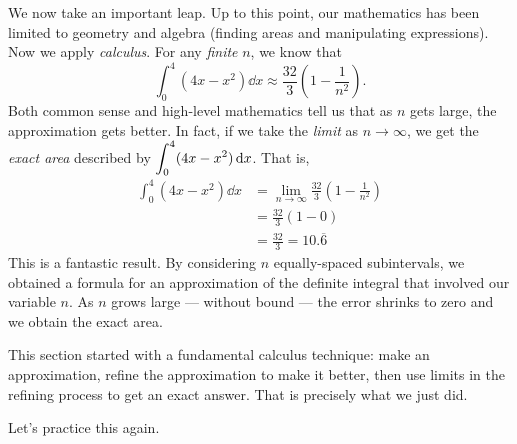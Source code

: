 We now take an important leap. Up to this point, our mathematics has been limited to geometry and algebra (finding areas and manipulating expressions). Now we apply \emph{calculus}. For any \emph{finite} $n$, we know that
\[\int_0^4 (4x-x^2)\dd x \approx \frac{32}{3}\left(1-\frac{1}{n^2}\right).\]
Both common sense and high-level mathematics tell us that as $n$ gets large, the approximation gets better. In fact, if we take the \emph{limit} as $n\rightarrow \infty$, we get the \emph{exact area} described by $\displaystyle\int_0^4 (4x-x^2)\operatorname{d}\! x$. That is, 
\begin{align*}
	\int_0^4 (4x-x^2)\dd x
	&= \lim_{n\to\infty} \frac{32}{3}\left(1-\frac{1}{n^2}\right) \\
	&= \frac{32}{3}\left(1-0\right)\\
	&= \frac{32}{3} = 10.\overline{6}
\end{align*}
This is a fantastic result. By considering $n$ equally-spaced subintervals, we obtained a formula for an approximation of the definite integral that involved our variable $n$. As $n$ grows large --- without bound --- the error shrinks to zero and we obtain the exact area.

This section started with a fundamental calculus technique: make an approximation, refine the approximation to make it better, then use limits in the refining process to get an exact answer. That is precisely what we just did.

Let's practice this again.

